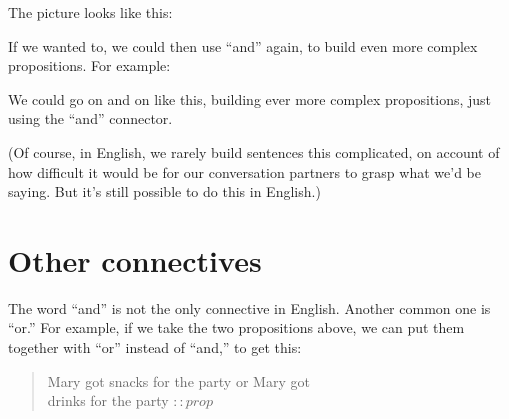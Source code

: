 \documentclass[../../../main.tex]{subfiles}
\begin{document}
The picture looks like this:

\begin{prooftree*}
  
  
\end{prooftree*}

\noindent
If we wanted to, we could then use ``and'' again, to build even more complex propositions. For example:

\begin{prooftree*}
  
  
  
  
\end{prooftree*}

\noindent
We could go on and on like this, building ever more complex propositions, just using the ``and'' connector. 

(Of course, in English, we rarely build sentences this complicated, on account of how difficult it would be for our conversation partners to grasp what we'd be saying. But it's still possible to do this in English.)


\section{Other connectives}

The word ``and'' is not the only connective in English. Another common one is ``or.'' For example, if we take the two propositions above, we can put them together with ``or'' instead of ``and,'' to get this:

\begin{quote}
  Mary got snacks for the party or Mary got \\ drinks for the party $:: prop$
\end{quote}
\end{document}
